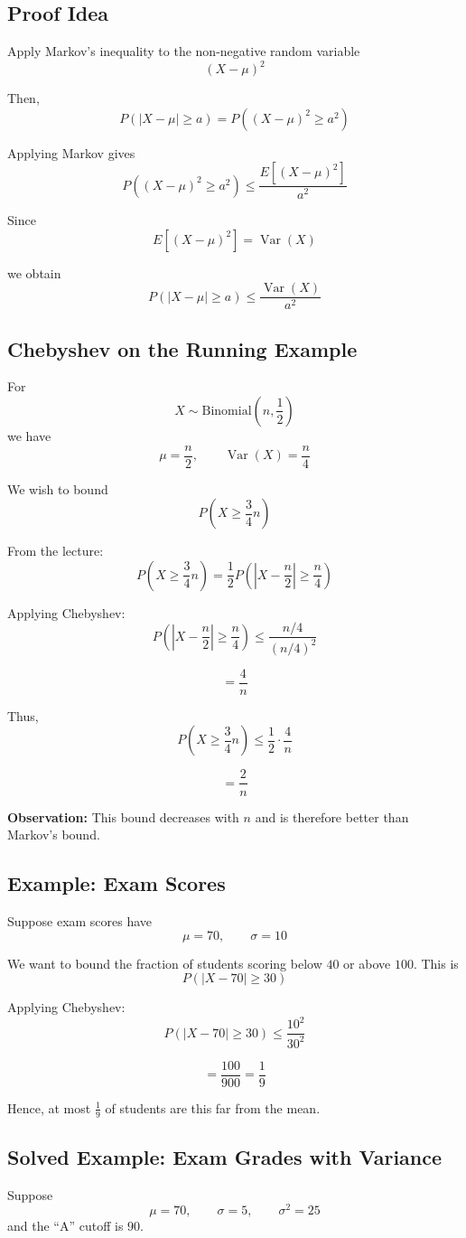 \documentclass[12pt]{article}
\begin{document}
\subsection{Proof Idea}
Apply Markov’s inequality to the non-negative random variable
\[
(X-\mu)^2
\]

Then,
\[
P(|X-\mu|\ge a)=P((X-\mu)^2\ge a^2)
\]

Applying Markov gives
\[
P((X-\mu)^2\ge a^2)\le \frac{E[(X-\mu)^2]}{a^2}
\]

Since
\[
E[(X-\mu)^2]=\operatorname{Var}(X)
\]

we obtain
\[
P(|X-\mu|\ge a)\le \frac{\operatorname{Var}(X)}{a^2}
\]

\subsection{Chebyshev on the Running Example}
For
\[
X \sim \text{Binomial}\left(n,\frac12\right)
\]
we have
\[
\mu=\frac n2,\qquad \operatorname{Var}(X)=\frac n4
\]

We wish to bound
\[
P\left(X \ge \frac34 n\right)
\]

From the lecture:
\[
P\left(X \ge \frac34 n\right)
=
\frac12 P\left(\left|X-\frac n2\right|\ge \frac n4\right)
\]

Applying Chebyshev:
\[
P\left(\left|X-\frac n2\right|\ge \frac n4\right)\le \frac{n/4}{(n/4)^2}
\]

\[
=\frac{4}{n}
\]

Thus,
\[
P\left(X \ge \frac34 n\right)\le \frac12\cdot \frac{4}{n}
\]

\[
=\frac{2}{n}
\]

\textbf{Observation:} This bound decreases with \(n\) and is therefore better than Markov’s bound.

\subsection{Example: Exam Scores}
Suppose exam scores have
\[
\mu=70,\qquad \sigma=10
\]

We want to bound the fraction of students scoring below \(40\) or above \(100\). This is
\[
P(|X-70|\ge 30)
\]

Applying Chebyshev:
\[
P(|X-70|\ge 30)\le \frac{10^2}{30^2}
\]

\[
=\frac{100}{900}=\frac19
\]

Hence, at most \(\frac19\) of students are this far from the mean.

\subsection{Solved Example: Exam Grades with Variance}
Suppose
\[
\mu=70,\qquad \sigma=5,\qquad \sigma^2=25
\]
and the ``A'' cutoff is \(90\).
\end{document}

